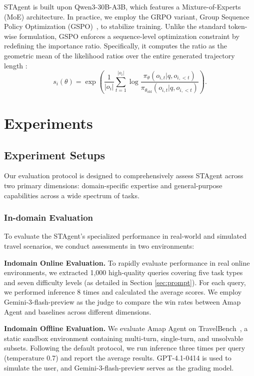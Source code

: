 \documentclass{article} %
\newcommand{\model}{STAgent\xspace}
\begin{document}
\model is built upon Qwen3-30B-A3B, which features a Mixture-of-Experts (MoE) architecture. In practice, we employ the GRPO variant, Group Sequence Policy Optimization (GSPO)~\citep{zheng2025group}, to stabilize training. Unlike the standard token-wise formulation, GSPO enforces a sequence-level optimization constraint by redefining the importance ratio. Specifically, it computes the ratio as the geometric mean of the likelihood ratios over the entire generated trajectory length :
\begin{equation}
s_i(\theta) = \exp \left( \frac{1}{|o_i|} \sum_{t=1}^{|o_i|} \log \frac{\pi_\theta(o_{i,t}|q, o_{i,<t})}{\pi_{\theta_{\text{old}}}(o_{i,t}|q, o_{i,<t})} \right).
\end{equation}

\section{Experiments}
\subsection{Experiment Setups}

Our evaluation protocol is designed to comprehensively assess \model across two primary dimensions: domain-specific expertise and general-purpose capabilities across a wide spectrum of tasks.

\subsubsection*{In-domain Evaluation}

To evaluate the \model's specialized performance in real-world and simulated travel scenarios, we conduct assessments in two environments:

\textbf{Indomain Online Evaluation.} To rapidly evaluate performance in real online environments, we extracted 1,000 high-quality queries covering five task types and seven difficulty levels (as detailed in Section \ref{sec:prompt}). For each query, we performed inference 8 times and calculated the average scores. We employ Gemini-3-flash-preview as the judge to compare the win rates between Amap Agent and baselines across different dimensions.

\textbf{Indomain Offline Evaluation.} We evaluate Amap Agent on TravelBench~\cite{Cheng2025TravelBenchAR}, a static sandbox environment containing multi-turn, single-turn, and unsolvable subsets. Following the default protocol, we run inference three times per query (temperature 0.7) and report the average results. GPT-4.1-0414 is used to simulate the user, and Gemini-3-flash-preview serves as the grading model.
\end{document}
